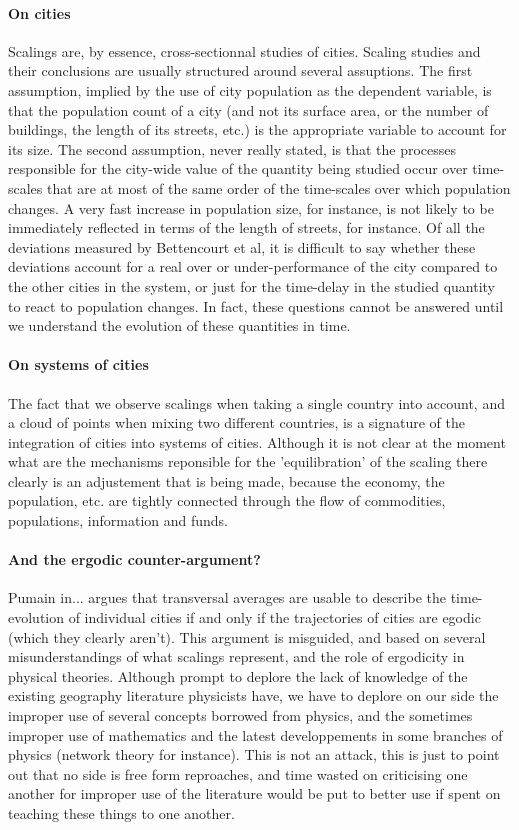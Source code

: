 \paragraph{On cities} Scalings are, by essence, cross-sectionnal studies of cities. Scaling studies
and their conclusions are usually structured around several assuptions. The
first assumption, implied by the use of city population as the dependent
variable, is that the population count of a city (and not its surface area, or the
number of buildings, the length of its streets, etc.) is the appropriate variable to
account for its size. The second assumption, never really stated, is that the
processes responsible for the city-wide value of the quantity being studied
occur over time-scales that are at most of the same order of the time-scales
over which population changes. A very fast increase in population size, for
instance, is not likely to be immediately reflected in terms of the length of
streets, for instance. Of all the deviations measured by Bettencourt et al, it
is difficult to say whether these deviations account for a real over or
under-performance of the city compared to the other cities in the system, or
just for the time-delay in the studied quantity to react to population
changes. In fact, these questions cannot be answered until we understand the
evolution of these quantities in time.

\paragraph{On systems of cities} The fact that we observe scalings when taking a
single country into account, and a cloud of points when mixing two different
countries, is a signature of the integration of cities into systems of
cities. Although it is not clear at the moment what are the mechanisms
reponsible for the 'equilibration' of the scaling there clearly is an
adjustement that is being made, because the economy, the population, etc. are
tightly connected through the flow of commodities, populations, information and
funds.

\paragraph{And the ergodic counter-argument?} Pumain in... argues that
transversal averages are usable to describe the time-evolution of individual
cities if and only if the trajectories of cities are egodic (which they clearly
aren't). This argument is misguided, and based on several misunderstandings of
what scalings represent, and the role of ergodicity in physical theories.
Although prompt to deplore the lack of knowledge of the existing geography
literature physicists have, we have to deplore on our side the improper use of
several concepts borrowed from physics, and the sometimes improper use of
mathematics and the latest developpements in some branches of physics (network
theory for instance). This is not an attack, this is just to point out that no
side is free form reproaches, and time wasted on criticising one another for
improper use of the literature would be put to better use if spent on teaching
these things to one another.

